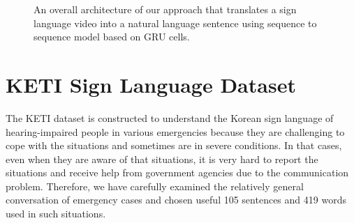\documentclass[10pt,twocolumn,letterpaper]{article}
\begin{document}
\begin{figure*}
\caption{An overall architecture of our approach that translates a sign language video into a natural language sentence using sequence to sequence model based on GRU cells.}
\end{figure*}


\section{KETI Sign Language Dataset}

The KETI dataset is constructed to understand the Korean sign language of hearing-impaired people in various emergencies because they are challenging to cope with the situations and sometimes are in severe conditions.
In that cases, even when they are aware of that situations, it is very hard to report the situations and receive help from government agencies due to the communication problem.
Therefore, we have carefully examined the relatively general conversation of emergency cases and chosen useful 105 sentences and 419 words used in such situations. 
\end{document}
